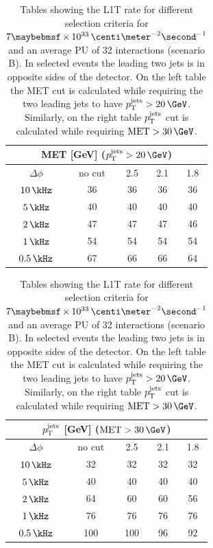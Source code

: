 \begin{table}[!htb]
\begin{minipage}{.5\linewidth}
  \centering
  \begin{tabular}{|c||c|c|c|c|}
  \hline
  \multicolumn{5}{|c|}{MET [GeV] ($\pt^{\text{jets}}>20\,\GeV$)} \\
  \hline\hline
  $\Delta\phi$ & no cut & 2.5 & 2.1 & 1.8 \\
  \hline
   $10\,\kHz$  &     36 &  36 &  36 &  36 \\
    $5\,\kHz$  &     40 &  40 &  40 &  40 \\
  \hline\hline
    $2\,\kHz$  &     47 &  47 &  47 &  46 \\
  \hline\hline
    $1\,\kHz$  &     54 &  54 &  54 &  54 \\
  $0.5\,\kHz$  &     67 &  66 &  66 &  64 \\
  \hline
  \end{tabular}
\end{minipage}%
  \begin{minipage}{.5\linewidth}
    \centering
  \begin{tabular}{|c||c|c|c|c|}
  \hline
  \multicolumn{5}{|c|}{$p_{\mathrm{T}}^{\text{jets}}$ [GeV] ($\text{MET}>30\,\GeV$)} \\
  \hline
  $\Delta\phi$ & no cut & 2.5 & 2.1 & 1.8 \\
  \hline\hline
   $10\,\kHz$  &     32 &  32 &  32 &  32 \\
    $5\,\kHz$  &     40 &  40 &  40 &  40 \\
  \hline\hline
    $2\,\kHz$  &     64 &  60 &  60 &  56 \\
  \hline\hline
    $1\,\kHz$  &     76 &  76 &  76 &  76 \\
  $0.5\,\kHz$  &    100 & 100 &  96 &  92 \\
  \hline
  \end{tabular}
\end{minipage} 
\caption{Tables showing the \gls{L1T} rate for different selection criteria for $7 \times 10^{33}\,\centi\meter^{-2}\second^{-1}$ and an average \gls{PU} of 32 interactions (scenario B). In selected events the leading two jets is in opposite sides of the detector. On the left table the \gls{MET} cut is calculated while requiring the two leading jets to have $\pt^{\text{jets}} > 20\,\GeV$. Similarly, on the right table $p_{\mathrm{T}}^{\text{jets}}$ cut is calculated while requiring $\text{MET}>30\,\GeV$.}
\label{TABLE:ParkedDataAnalysis_L1TParkedTriggerDevelopment_Rate7E33}
\end{table}

